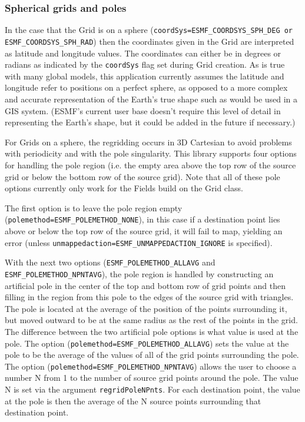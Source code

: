\subsubsection{Spherical grids and poles}
In the case that the Grid is on a sphere ({\tt coordSys=ESMF\_COORDSYS\_SPH\_DEG or ESMF\_COORDSYS\_SPH\_RAD})
then the coordinates given in the Grid are interpreted as latitude and longitude values. The coordinates can either be in degrees or radians as indicated by the 
{\tt coordSys} flag set during Grid creation. As is true with many global models, this application currently assumes the latitude and longitude refer to positions on a 
perfect sphere, as opposed to a more complex and accurate representation of the Earth's true shape such as would be used in a GIS system. (ESMF's current user base doesn't 
require this level of detail in representing the Earth's shape, but it could be added in the future if necessary.)

For Grids on a sphere, the regridding occurs in 3D Cartesian to avoid
problems with periodicity and with the pole singularity. This library
 supports four options for handling the pole region (i.e. the empty area above the top row of the source grid or below
 the bottom row of the source grid).  Note that all of these pole options currently only work for the Fields build on the Grid class.

 The first option is to leave the pole region empty ({\tt polemethod=ESMF\_POLEMETHOD\_NONE}), in this 
 case if a destination point lies above or below the 
 top row of the source grid, it will fail to map, yielding an error (unless {\tt unmappedaction=ESMF\_UNMAPPEDACTION\_IGNORE} is specified).  

 With the next two options ({\tt ESMF\_POLEMETHOD\_ALLAVG} and {\tt ESMF\_POLEMETHOD\_NPNTAVG}), the pole region is handled by constructing 
 an artificial pole in the center of the top and bottom row of grid points and then filling
 in the region from this pole to the edges of the source grid with triangles. 
 The pole is located at the average of the position of the points surrounding
 it, but moved outward to be at the same radius as the rest of the points
 in the grid. The difference between the two artificial pole options is what value is used at the pole. 
 The option ({\tt polemethod=ESMF\_POLEMETHOD\_ALLAVG}) sets the value at the pole to be the average of the values
 of all of the grid points surrounding the pole. The option ({\tt polemethod=ESMF\_POLEMETHOD\_NPNTAVG}) allows the user to choose
 a number N from 1 to the number of source grid points around the pole. The value N is set via the argument {\tt regridPoleNPnts}. For
 each destination point, the value at the pole is then the average of the N source points
 surrounding that destination point. 

